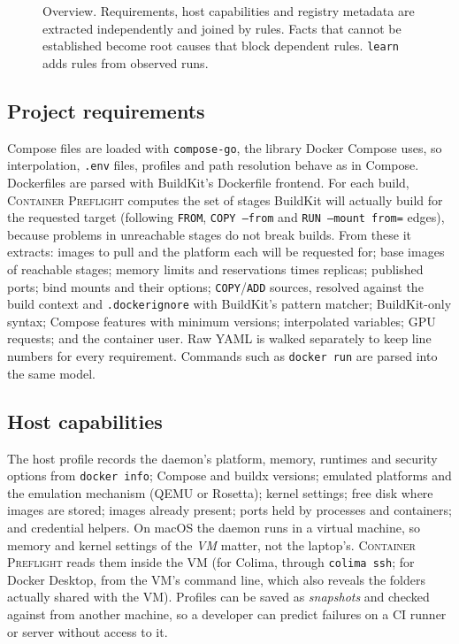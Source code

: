 \documentclass[preprint,12pt]{elsarticle}
\newcommand{\tool}{\textsc{Container Preflight}}
\begin{document}
\begin{figure}[t]
\caption{Overview. Requirements, host capabilities and registry metadata are extracted independently and joined by rules. Facts that cannot be established become root causes that block dependent rules. \texttt{learn} adds rules from observed runs.}
\label{fig:arch}
\end{figure}

\subsection{Project requirements}
Compose files are loaded with \texttt{compose-go}, the library Docker Compose uses, so interpolation, \texttt{.env} files, profiles and path resolution behave as in Compose. Dockerfiles are parsed with BuildKit's Dockerfile frontend. For each build, \tool{} computes the set of stages BuildKit will actually build for the requested target (following \texttt{FROM}, \texttt{COPY --from} and \texttt{RUN --mount from=} edges), because problems in unreachable stages do not break builds. From these it extracts: images to pull and the platform each will be requested for; base images of reachable stages; memory limits and reservations times replicas; published ports; bind mounts and their options; \texttt{COPY}/\texttt{ADD} sources, resolved against the build context and \texttt{.dockerignore} with BuildKit's pattern matcher; BuildKit-only syntax; Compose features with minimum versions; interpolated variables; GPU requests; and the container user. Raw YAML is walked separately to keep line numbers for every requirement. Commands such as \texttt{docker run} are parsed into the same model.

\subsection{Host capabilities}
The host profile records the daemon's platform, memory, runtimes and security options from \texttt{docker info}; Compose and buildx versions; emulated platforms and the emulation mechanism (QEMU or Rosetta); kernel settings; free disk where images are stored; images already present; ports held by processes and containers; and credential helpers. On macOS the daemon runs in a virtual machine, so memory and kernel settings of the \emph{VM} matter, not the laptop's. \tool{} reads them inside the VM (for Colima, through \texttt{colima ssh}; for Docker Desktop, from the VM's command line, which also reveals the folders actually shared with the VM). Profiles can be saved as \emph{snapshots} and checked against from another machine, so a developer can predict failures on a CI runner or server without access to it.
\end{document}
